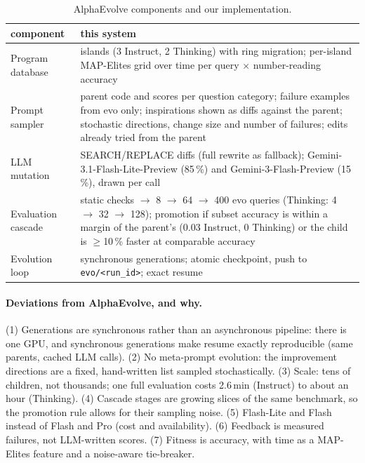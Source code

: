 \documentclass{article}
\begin{document}
\begin{table}[h]
\centering\small
\caption{AlphaEvolve components and our implementation.}
\label{tab:design}
\begin{tabularx}{\linewidth}{lX}
\toprule
component & this system \\
\midrule
Program database & islands (3 Instruct, 2 Thinking) with ring migration; per-island MAP-Elites grid over time per
query $\times$ number-reading accuracy \\
Prompt sampler & parent code and scores per question category; failure examples from evo only; inspirations shown
as diffs against the parent; stochastic directions, change size and number of failures; edits already tried from
the parent \\
LLM mutation & SEARCH/REPLACE diffs (full rewrite as fallback); Gemini-3.1-Flash-Lite-Preview (85\,\%) and
Gemini-3-Flash-Preview (15\,\%), drawn per call \\
Evaluation cascade & static checks $\rightarrow$ 8 $\rightarrow$ 64 $\rightarrow$ 400 evo queries (Thinking: 4
$\rightarrow$ 32 $\rightarrow$ 128); promotion if subset accuracy is within a margin of the parent's (0.03 Instruct, 0
Thinking) or the child is $\geq$10\,\% faster at comparable accuracy \\
Evolution loop & synchronous generations; atomic checkpoint, push to \texttt{evo/<run\_id>}; exact resume \\
\bottomrule
\end{tabularx}
\end{table}

\paragraph{Deviations from AlphaEvolve, and why.} (1) Generations are synchronous rather than an asynchronous
pipeline: there is one GPU, and synchronous generations make resume exactly reproducible (same parents, cached LLM
calls). (2) No meta-prompt evolution: the improvement directions are a fixed, hand-written list sampled
stochastically. (3) Scale: tens of children, not thousands; one full evaluation costs 2.6\,min (Instruct) to about
an hour (Thinking). (4) Cascade stages are growing slices of the same benchmark, so the promotion rule allows for
their sampling noise. (5) Flash-Lite and Flash instead of Flash and Pro (cost and availability). (6) Feedback is
measured failures, not LLM-written scores. (7) Fitness is accuracy, with time as a MAP-Elites feature and a
noise-aware tie-breaker.
\end{document}
